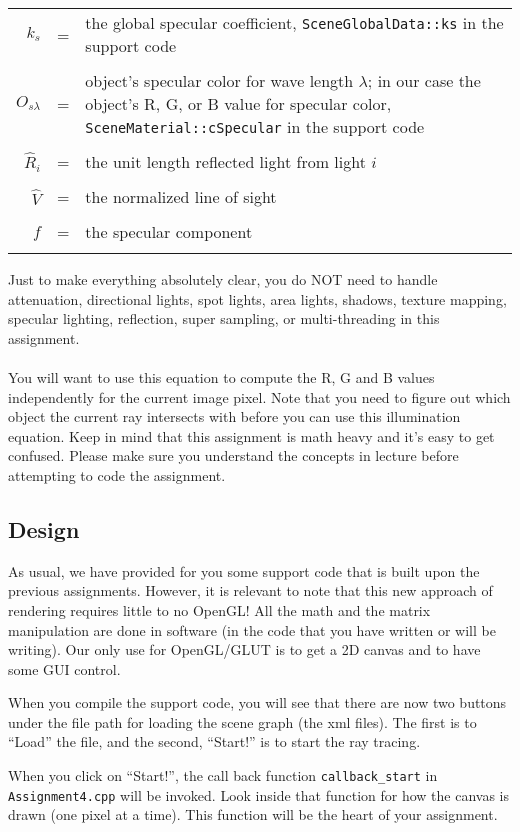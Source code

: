 \documentclass[10pt,twocolumn]{article}
\begin{document}
{\begin{tabular}{rcp{2.3in}}
$k_s$ &=& the global specular coefficient, {\small{\tt SceneGlobalData::ks}} in the support code\\\\
$O_{s\lambda}$ &=& object's specular color for wave length $\lambda$; in our case the object's R, G, or B value for specular color, {\small{\tt SceneMaterial::cSpecular}} in the support code\\\\
$\hat{R}_i$ &=& the unit length reflected light from light $i$\\\\
$\hat{V}$ &=& the normalized line of sight\\\\
$f$ &=& the specular component\\\\
\end{tabular}
Just to make everything absolutely clear, you do NOT need to handle attenuation, directional lights, spot lights, area lights, shadows, texture mapping, specular lighting, reflection, super sampling, or multi-threading in this assignment.\\\\
You will want to use this equation to compute the R, G and B values independently for the current image pixel. Note that you need to figure out which object the current ray intersects with before you can use this illumination equation. Keep in mind that this assignment is math heavy and it's easy to get confused. Please make sure you understand the concepts in lecture before attempting to code the assignment.

\subsection{Design}
As usual, we have provided for you some support code that is built upon the previous assignments. However, it is relevant to note that this new approach of rendering requires little to no OpenGL! All the math and the matrix manipulation are done in software (in the code that you have written or will be writing). Our only use for OpenGL/GLUT is to get a 2D canvas and to have some GUI control.

When you compile the support code, you will see that there are now two buttons under the file path for loading the scene graph (the xml files). The first is to ``Load'' the file, and the second, ``Start!'' is to start the ray tracing.

When you click on ``Start!'', the call back function {\tt callback\_start} in {\tt Assignment4.cpp} will be invoked. Look inside that function for how the canvas is drawn (one pixel at a time). This function will be the heart of your assignment.

}
\end{document}

